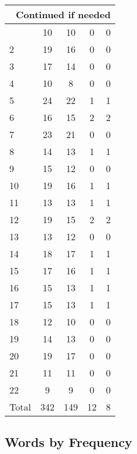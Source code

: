 \begin{center}
\begin{longtable}{l|c|c|c|c}
\hline \multicolumn{5}{|r|}{{Continued if needed}} \\ \hline
\endfoot 
1 & 10 & 10 & 0 & 0\\ \hline
2 & 19 & 16 & 0 & 0\\ \hline
3 & 17 & 14 & 0 & 0\\ \hline
4 & 10 & 8 & 0 & 0\\ \hline
5 & 24 & 22 & 1 & 1\\ \hline
6 & 16 & 15 & 2 & 2\\ \hline
7 & 23 & 21 & 0 & 0\\ \hline
8 & 14 & 13 & 1 & 1\\ \hline
9 & 15 & 12 & 0 & 0\\ \hline
10 & 19 & 16 & 1 & 1\\ \hline
11 & 13 & 13 & 1 & 1\\ \hline
12 & 19 & 15 & 2 & 2\\ \hline
13 & 13 & 12 & 0 & 0\\ \hline
14 & 18 & 17 & 1 & 1\\ \hline
15 & 17 & 16 & 1 & 1\\ \hline
16 & 15 & 13 & 1 & 1\\ \hline
17 & 15 & 13 & 1 & 1\\ \hline
18 & 12 & 10 & 0 & 0\\ \hline
19 & 14 & 13 & 0 & 0\\ \hline
20 & 19 & 17 & 0 & 0\\ \hline
21 & 11 & 11 & 0 & 0\\ \hline
22 & 9 & 9 & 0 & 0\\ \hline
\hline \hline
Total & 342 & 149 & 12 & 8



\end{longtable}
\end{center}

 
\subsection{Words by Frequency}

